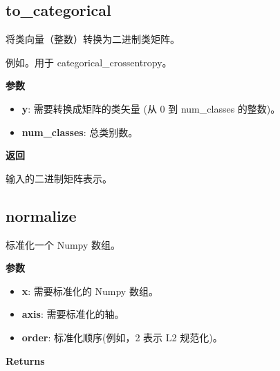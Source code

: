 \subsection{to\_categorical}\label{toux5fcategorical}

\begin{Shaded}
\begin{Highlighting}[]
\OperatorTok{=}\NormalTok{)}
\end{Highlighting}
\end{Shaded}

将类向量（整数）转换为二进制类矩阵。

例如。用于 categorical\_crossentropy。

\textbf{参数}

\begin{itemize}
\tightlist
\item
  \textbf{y}: 需要转换成矩阵的类矢量 (从 0 到 num\_classes 的整数)。
\item
  \textbf{num\_classes}: 总类别数。
\end{itemize}

\textbf{返回}

输入的二进制矩阵表示。



\subsection{normalize}\label{normalize}

\begin{Shaded}
\begin{Highlighting}[]
\OperatorTok{=-}\OperatorTok{=}\NormalTok{)}
\end{Highlighting}
\end{Shaded}

标准化一个 Numpy 数组。

\textbf{参数}

\begin{itemize}
\tightlist
\item
  \textbf{x}: 需要标准化的 Numpy 数组。
\item
  \textbf{axis}: 需要标准化的轴。
\item
  \textbf{order}: 标准化顺序(例如，2 表示 L2 规范化)。
\end{itemize}

\textbf{Returns}

